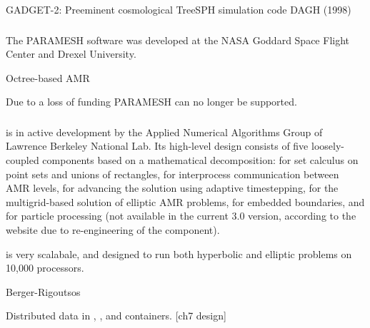 \documentclass[14pt,letter]{article}
\begin{document}
GADGET-2: Preeminent cosmological TreeSPH simulation code
DAGH (1998)

\subsubsection{} \label{sss:paramesh}

\nocite{wwwparamesh}
\nocite{MaOl00} %
\nocite{OlMa05}
\nocite{Ol06}

The PARAMESH software was developed at the NASA Goddard Space Flight
Center and Drexel University.

Octree-based AMR


Due to a loss of funding PARAMESH can no longer be supported.

\subsubsection{} \label{sss:chombo}

\nocite{wwwchombo}
\nocite{CoGr09}

 is in active development by the Applied Numerical Algorithms
Group of Lawrence Berkeley National Lab.  Its high-level design
consists of five loosely-coupled components based on a mathematical
decomposition:  for set calculus on point sets and
unions of rectangles,  for interprocess communication
between AMR levels,  for advancing the solution
using adaptive timestepping,  for the
multigrid-based solution of elliptic AMR problems,  for
embedded boundaries, and  for particle processing
(not available in the current 3.0 version, according to the website
due to re-engineering of the component).

 is very scalabale, and designed to run both hyperbolic and
elliptic problems on 10,000 processors.

Berger-Rigoutsos 


Distributed data in , , and 
 containers. [ch7 design]
\end{document}
